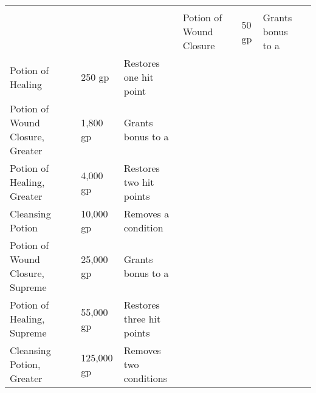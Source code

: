 
\begin{longtabuwrapper}
\begin{longtabu}{l l l X l}
 \\
 &  &  &  &  \tableheaderrule
Potion of Wound Closure &  & 50 gp & Grants  bonus to a  & \pageref{item:Potion of Wound Closure} \\
Potion of Healing &  & 250 gp & Restores one hit point & \pageref{item:Potion of Healing} \\
Potion of Wound Closure, Greater &  & 1,800 gp & Grants  bonus to a  & \pageref{item:Potion of Wound Closure, Greater} \\
Potion of Healing, Greater &  & 4,000 gp & Restores two hit points & \pageref{item:Potion of Healing, Greater} \\
Cleansing Potion &  & 10,000 gp & Removes a condition & \pageref{item:Cleansing Potion} \\
Potion of Wound Closure, Supreme &  & 25,000 gp & Grants  bonus to a  & \pageref{item:Potion of Wound Closure, Supreme} \\
Potion of Healing, Supreme &  & 55,000 gp & Restores three hit points & \pageref{item:Potion of Healing, Supreme} \\
Cleansing Potion, Greater &  & 125,000 gp & Removes two conditions & \pageref{item:Cleansing Potion, Greater} \\
\end{longtabu}
\end{longtabuwrapper}
